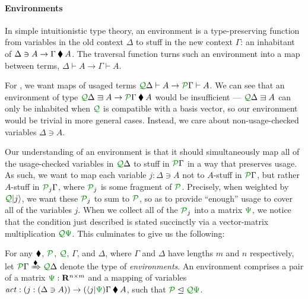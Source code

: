 \documentclass[submission,copyright,creativecommons]{eptcs}
\begin{document}
\paragraph{Environments}
In simple intuitionistic type theory, an
environment is a type-preserving function from variables in the old
context $\Delta$ to stuff in the new context $\Gamma$: an inhabitant
of $\Delta \ni A \to \Gamma \mathbin{\blacklozenge} A$.  The traversal function turns
such an environment into a map between terms,
$\Delta \vdash A \to \Gamma \vdash A$.

For \name{}, we want maps of usaged terms
$\ctx{\Delta}{Q} \vdash A \to \ctx{\Gamma}{P} \vdash A$.
We can see that an environment of type
$\ctx{\Delta}{Q} \lvar A \to \ctx{\Gamma}{P} \kitrel A$ would
be insufficient --- $\ctx{\Delta}{Q} \lvar A$ can only be inhabited when
$\resctx Q$ is compatible with a basis vector, so our environment would be
trivial in more general cases.
Instead, we care about non-usage-checked variables $\Delta \ni A$.

Our understanding of an environment is that it should simultaneously
map all of the usage-checked variables in $\ctx{\Delta}{Q}$ to stuff
in $\ctx{\Gamma}{P}$ in a way that preserves usage.  As such, we want
to map each variable $j : \Delta \ni A$ not to $A$-stuff in
$\ctx{\Gamma}{P}$, but rather $A$-stuff in $\resctx P_j\Gamma$, where
$\resctx P_j$ is some fragment of $\resctx P$.  Precisely, when
weighted by $\resctx Q\lvert j \rangle$, we want these $\resctx P_j$
to sum to $\resctx P$, so as to provide ``enough'' usage to cover all
of the variables $j$.  When we collect all of the $\resctx P_j$ into a
matrix $\rescomment\Psi$, we notice that the condition just described
is stated succinctly via a vector-matrix multiplication
$\resctx Q\rescomment\Psi$. This culminates to give us the following:

\begin{definition}\label{def:env}
  For any $\mathbin{\blacklozenge}$, $\resctx P$, $\resctx Q$, $\Gamma$, and $\Delta$,
  where $\Gamma$ and $\Delta$ have lengths $m$ and $n$ respectively,
  let $\ctx{\Gamma}{P} \subst{\kitrel} \ctx{\Delta}{Q}$ denote the
  type of \emph{environments}.  An environment comprises a pair of a
  matrix $\rescomment\Psi : \mathbf R^{n \times m}$ and a mapping of
  variables
  $\mathit{act} : (j : (\Delta \ni A)) \to (\langle j
  \rvert\rescomment\Psi)\Gamma \kitrel A$, such that
  $\resctx P \subres \resctx Q \rescomment\Psi$.
\end{definition}
\end{document}
